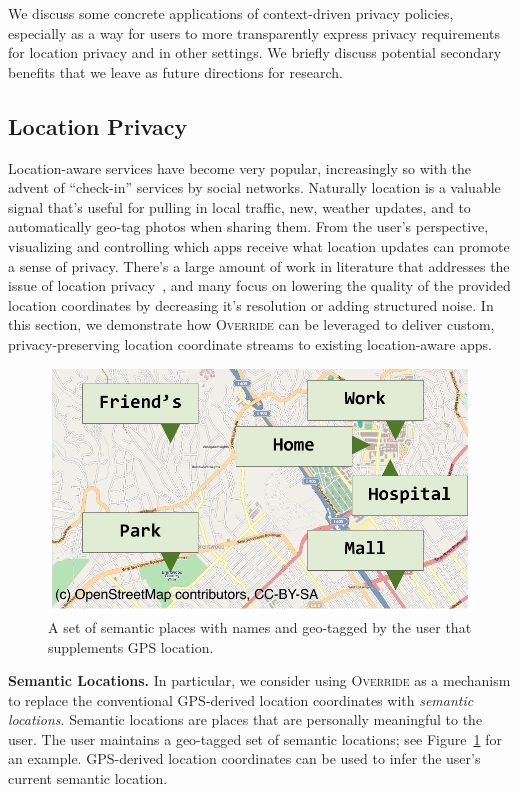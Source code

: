 \documentclass[10pt]{sensys-proc}
\begin{document}
We discuss some concrete applications of context-driven privacy policies, especially as a way for users to more transparently express privacy requirements for location privacy and in other settings. We briefly discuss potential secondary benefits that we leave as future directions for research.

\subsection{Location Privacy}

Location-aware services have become very popular, increasingly so with the advent of ``check-in'' services by social networks. Naturally location is a valuable signal that's useful for pulling in local traffic, new, weather updates, and to automatically geo-tag photos when sharing them. From the user's perspective, visualizing and controlling which apps receive what location updates can promote a sense of privacy. There's a large amount of work in literature that addresses the issue of location privacy~\cite{krumm:survey}, and many focus on lowering the quality of the provided location coordinates by decreasing it's resolution or adding structured noise. In this section, we demonstrate how \textsc{Override} can be leveraged to deliver custom, privacy-preserving location coordinate streams to existing location-aware apps.

\begin{figure}[h]
\label{fig:semantic_places}
\includegraphics[width=\columnwidth]{../figures/semantic_location_3.pdf}
\caption{A set of semantic places with names and geo-tagged by the user that supplements GPS location.}
\end{figure}

\textbf{Semantic Locations.} In particular, we consider using \textsc{Override} as a mechanism to replace the conventional GPS-derived location coordinates with \emph{semantic locations}. Semantic locations are places that are personally meaningful to the user. The user maintains a geo-tagged set of semantic locations; see Figure~\ref{fig:semantic_places} for an example. GPS-derived location coordinates can be used to infer the user's current semantic location.
\end{document}

